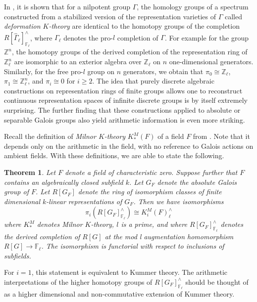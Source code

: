 \documentclass[11pt]{article}
\newcommand\mb{\mathbb}
\newtheorem{Theorem}{Theorem}[section]
\begin{document}
 In \cite{lawson}, it is shown that for a nilpotent group $\Gamma$,  the homology  groups of  a spectrum constructed from a stabilized version of the representation varieties of $\Gamma$ called {\em deformation $K$-theory} are  identical to the homotopy groups of the completion $R[\hat{\Gamma}_{\ell}]_{\mathbb{F}_{\ell}}^{\wedge}$, where $\Gamma _{\ell}$ denotes the pro-$l$ completion of $\Gamma$.  For example for the group $\mathbb{Z}^n$, the homotopy groups of the derived completion of the representation ring of $\mathbb{Z}_{\ell}^n$ are isomorphic to an exterior algebra over $\mathbb{Z}_{\ell}$ on $n$ one-dimensional generators.  Similarly, for the free pro-$l$ group on $n$ generators, we obtain that $\pi _0 \cong \mathbb{Z}_{\ell}$, $\pi _1 \cong \mathbb{Z}_{\ell}^n$, and $\pi _i \cong 0$ for $i \geq 2$. The idea that  purely discrete algebraic constructions on representation rings of finite groups allows one to reconstruct continuous representation spaces of infinite discrete groups  is by itself  extremely  surprising. The further finding  that  these constructions applied to absolute or separable Galois groups also yield arithmetic information is even more striking.  

 Recall the definition of {\em Milnor $K$-theory}  $K_*^M(F) $ of a field $F$ from \cite{milnor}. Note that it depends only on the arithmetic in the field, with no reference to Galois actions on ambient fields.  
  With these definitions, we are able to state the following. 
\begin{Theorem}\label{bigtheorem} 
    Let $F$ denote a  field  of characteristic zero.  Suppose further that $F$ contains an algebraically closed subfield $k$. Let $G_F$ denote the absolute   Galois group of $F$.   Let $R[G_F]$ denote the ring of isomorphism classes of finite dimensional $k$-linear representations of $G_F$.   Then we have  isomorphisms 
    $$ \pi _i ({R}[G_F]^{\wedge}_{\mb{F}_{\ell}}) \cong K^{M}_i(F) ^{\wedge}_{\ell}
    $$ where $K^M_*$ denotes Milnor $K$-theory,  $l$ is a prime, and where ${R}[G_F]^{\wedge}_{\mb{F}_{\ell}}$ denotes the derived completion of $R[G]$ at the mod l augmentation homomorphism $R[G] \rightarrow \mb{F}_{\ell}$.   The isomorphism is functorial with respect to inclusions of subfields.  
\end{Theorem}

For $i =1$, this statement is equivalent to Kummer theory.  The arithmetic interpretations of the higher homotopy groups  of $R[G_F]^{\wedge}_{\mb{F}_{\ell}}$ should be thought of as a higher dimensional and non-commutative extension of Kummer theory.
\end{document}
